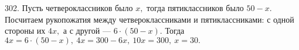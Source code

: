 302. Пусть четвероклассников было $x,$ тогда пятиклассников было  $50-x.$ Посчитаем рукопожатия между четвероклассниками и пятиклассниками: с одной стороны их $4x,$ а с другой --- $6\cdot(50-x).$ Тогда $4x=6\cdot(50-x),\
4x=300-6x,\ 10x=300,\ x=30.$\\
